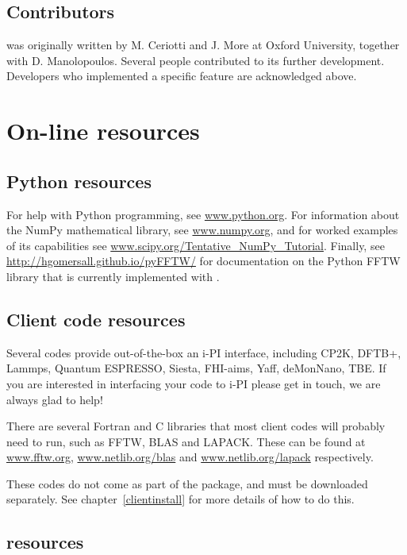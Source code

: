 \documentclass[11pt,english,fleqn]{report}
\begin{document}
\subsection{Contributors}

\ipi was originally written by M. Ceriotti and J. More at Oxford University,
together with D. Manolopoulos. Several people contributed to its further development. Developers who implemented a specific feature are acknowledged above.


\section{On-line resources}


\subsection{Python resources}

For help with Python programming, see \url{www.python.org}. For information
about the NumPy mathematical library, see \url{www.numpy.org}, and
for worked examples of its capabilities see \url{www.scipy.org/Tentative_NumPy_Tutorial}.
Finally, see \url{http://hgomersall.github.io/pyFFTW/} for documentation
on the Python FFTW library that is currently implemented with \ipi.


\subsection{Client code resources}

\label{librarywebsites}

Several codes provide out-of-the-box an i-PI interface, including CP2K, DFTB+, Lammps, Quantum ESPRESSO, Siesta, FHI-aims, Yaff, deMonNano, TBE. If you are interested in interfacing your code to i-PI please get in touch, we are always glad to help!

There are several Fortran and C libraries that most client codes will
probably need to run, such as FFTW, BLAS and LAPACK. These can be
found at \url{www.fftw.org}, \url{www.netlib.org/blas} and \url{www.netlib.org/lapack}
respectively.

These codes do not come as part of the \ipi package, and must be
downloaded separately. See chapter~\ref{clientinstall} for more details
of how to do this. 


\subsection{\ipi resources}
\end{document}

